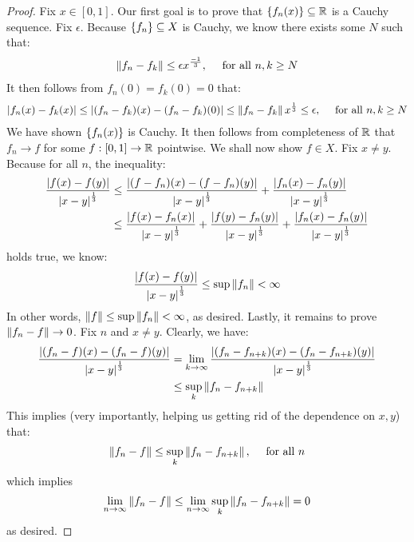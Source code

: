 \documentclass{report}
\begin{document}
\begin{proof}
Fix $x \in [0,1]$. Our first goal is to prove that  $\left\{ f_n(x) \right\}\subseteq \mathbb{R}$ is a Cauchy sequence. Fix $ \epsilon  $. Because $\left\{ f_n \right\}\subseteq X$ is Cauchy, we know there exists some $N$ such that: 
\begin{align*}
\left\| f_n- f_k \right\| \leq \epsilon x^{\frac{-1}{3}},\quad \text{ for all }n,k\geq N
\end{align*}
It then follows from $f_n(0)=f_k(0)=0$ that: 
\begin{align*}
  \left|f_n(x)-f_k(x)\right| \leq \left|(f_n-f_k)(x)-(f_n-f_k)(0)\right|  \leq \left\| f_n-f_k \right\| x^{\frac{1}{3}} \leq \epsilon ,\quad \text{ for all }n,k\geq N
\end{align*}
We have shown $\left\{ f_n(x) \right\}$ is Cauchy. It then follows from completeness of $\mathbb{R}$ that  $f_n \rightarrow f$ for some $f:[0,1]\rightarrow \mathbb{R}$ pointwise. We shall now show $f \in X$. Fix $x\neq y$. Because for all $n$, the inequality: 
\begin{align*}
  \frac{\left|f(x)-f(y)\right|}{\left|x-y\right|^{\frac{1}{3}}} &\leq  \frac{\left|(f-f_n)(x)-(f-f_n)(y)\right| }{\left|x-y\right|^{\frac{1}{3}}}+ \frac{\left|f_n(x)-f_n(y)\right|}{\left|x-y\right|^{\frac{1}{3}}}  \\
  & \leq  \frac{\left|f(x)-f_n(x)\right|}{\left|x-y\right|^{\frac{1}{3}}} + \frac{\left|f(y)-f_n(y)\right|}{ \left|x-y\right|^{\frac{1}{3}}}+ \frac{\left|f_n(x)-f_n(y)\right|}{\left|x-y\right|^{\frac{1}{3}}}
\end{align*}
holds true, we know: 
\begin{align*}
 \frac{\left|f(x)-f(y)\right|}{\left|x-y\right|^{\frac{1}{3}}} \leq \sup \left\| f_n \right\|  < \infty
\end{align*}
In other words, $\left\| f \right\| \leq \operatorname{sup} \left\| f_n \right\|< \infty$, as desired. Lastly, it remains to prove $\left\| f_n-f \right\| \rightarrow 0$. Fix $n$ and $x \neq y$. Clearly, we have: 
\begin{align*}
 \frac{\left|(f_n-f)(x) -(f_n-f)(y)\right|}{\left|x-y\right|^{\frac{1}{3}}}&= \lim_{k\to \infty} \frac{\left|(f_n-f_{n+k})(x)-(f_n-f_{n+k})(y)\right|}{\left|x-y\right|^{\frac{1}{3}}}  \\
 &\leq \sup_k  \left\| f_n-f_{n+k} \right\|
\end{align*}
This implies (very importantly, helping us getting rid of the dependence on $x,y$) that: 
\begin{align*}
\left\| f_n-f \right\| \leq \sup_k \left\| f_n-f_{n+k} \right\|,\quad \text{ for all }n
\end{align*}
which implies 
\begin{align*}
\lim_{n\to \infty} \left\| f_n-f \right\| \leq \lim_{n\to \infty} \sup_k \left\| f_n-f_{n+k} \right\|=0 
\end{align*}
as desired.
\end{proof}
\end{document}
